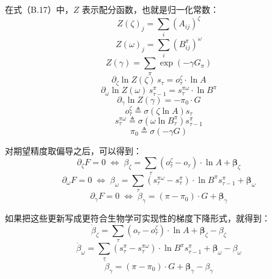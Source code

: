 在式（B.17）中，$Z$ 表示配分函数，也就是归一化常数：
\begin{equation}
Z(\zeta)_j=\sum_i (A_{ij})^\zeta
\end{equation}
\begin{equation}
Z(\omega)_j=\sum_i (B_{ij}^\pi)^\omega
\end{equation}
\begin{equation}
Z(\gamma)=\sum_\pi \exp(-\gamma G_\pi)
\end{equation}
\begin{equation}
\partial_\zeta \ln Z(\zeta)\,s_\tau=o_\tau^\zeta \cdot \ln A
\end{equation}
\begin{equation}
\partial_\omega \ln Z(\omega)\,s_{\tau-1}^\pi=s_\tau^{\pi\omega}\cdot \ln B^\pi
\end{equation}
\begin{equation}
\partial_\gamma \ln Z(\gamma)=-\pi_0\cdot G
\end{equation}
\begin{equation}
o_\tau^\zeta \triangleq \sigma(\zeta \ln A)s_\tau
\end{equation}
\begin{equation}
s_\tau^{\pi\omega} \triangleq \sigma(\omega \ln B_\tau^\pi)s_{\tau-1}^\pi
\end{equation}
\begin{equation}
\pi_0\triangleq \sigma(-\gamma G)
\tag{B.18}
\end{equation}

对期望精度取偏导之后，可以得到：
\begin{equation}
\partial_\zeta F=0
\;\Leftrightarrow\;
\beta_\zeta=\sum_\tau (o_\tau^\zeta-o_\tau)\cdot \ln A+\boldsymbol{\beta}_\zeta
\tag{B.19a}
\end{equation}
\begin{equation}
\partial_\omega F=0
\;\Leftrightarrow\;
\beta_\omega=\sum_\tau (s_\tau^{\pi\omega}-s_\tau^\pi)\cdot \ln B^\pi s_{\tau-1}^\pi+\boldsymbol{\beta}_\omega
\tag{B.19b}
\end{equation}
\begin{equation}
\partial_\gamma F=0
\;\Leftrightarrow\;
\beta_\gamma=(\pi-\pi_0)\cdot G+\boldsymbol{\beta}_\gamma
\tag{B.19c}
\end{equation}

如果把这些更新写成更符合生物学可实现性的梯度下降形式，就得到：
\begin{equation}
\dot{\beta}_\zeta
=
\sum_\tau (o_\tau-o_\tau^\zeta)\cdot \ln A
+\boldsymbol{\beta}_\zeta-\beta_\zeta
\tag{B.20a}
\end{equation}
\begin{equation}
\dot{\beta}_\omega
=
\sum_\tau (s_\tau^\pi-s_\tau^{\pi\omega})\cdot \ln B^\pi s_{\tau-1}^\pi
+\boldsymbol{\beta}_\omega-\beta_\omega
\tag{B.20b}
\end{equation}
\begin{equation}
\dot{\beta}_\gamma
=
(\pi-\pi_0)\cdot G+\boldsymbol{\beta}_\gamma-\beta_\gamma
\tag{B.20c}
\end{equation}

